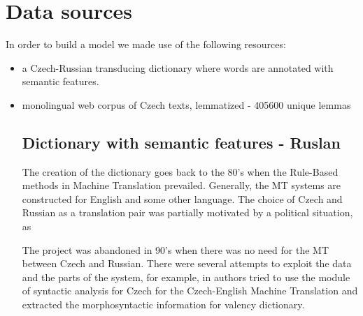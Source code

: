 \documentclass[letterpaper]{article}
\begin{document}
\section{Data sources}
In order to build a model we made use of the following resources:
\begin{itemize}
 \item a Czech-Russian transducing dictionary where words are annotated with semantic features.
 \item monolingual web corpus of Czech texts, lemmatized - 405600 unique lemmas

\subsection{Dictionary with semantic features - Ruslan}
The creation of the dictionary \cite{oliva1989parser}
goes back to the 80's when the Rule-Based methods
in Machine Translation prevailed. Generally, the MT systems are constructed for
English and some other language. The choice of Czech and Russian as
a translation pair was partially motivated by a political situation, as

 The project was abandoned in 90's when
there was no need for the MT between Czech and Russian. There were
several attempts to exploit the data and the parts of the system, for
example, in \cite{mt-recycled} authors tried to use the module
of syntactic analysis for Czech for the Czech-English Machine Translation
and \cite{pisa2012} extracted the morphosyntactic information for
valency dictionary.

\end{itemize}
\end{document}
